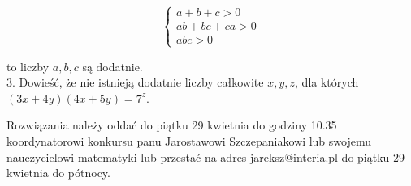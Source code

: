 \documentclass[10pt]{article}
\begin{document}
\[
\left\{\begin{array}{c}
a+b+c>0 \\
a b+b c+c a>0 \\
a b c>0
\end{array}\right.
\]

to liczby \(a, b, c\) są dodatnie.\\
3. Dowieść, że nie istnieją dodatnie liczby całkowite \(x, y, z\), dla których \((3 x+4 y)(4 x+5 y)=7^{z}\).

Rozwiązania należy oddać do piątku 29 kwietnia do godziny 10.35 koordynatorowi konkursu panu Jarostawowi Szczepaniakowi lub swojemu nauczycielowi matematyki lub przestać na adres \href{mailto:jareksz@interia.pl}{jareksz@interia.pl} do piątku 29 kwietnia do pótnocy.
\end{document}
